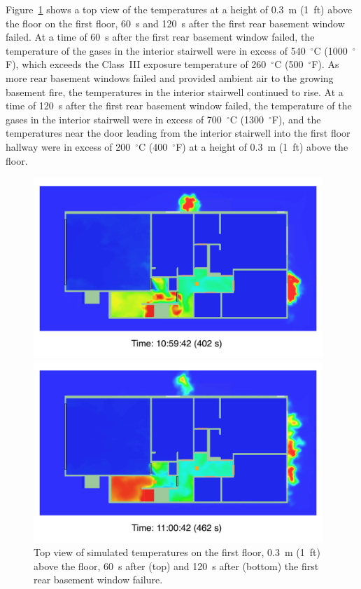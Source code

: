 \documentclass[12pt,oneside]{book}
\begin{document}
Figure~\ref{fig:smv_flow_path_top_2} shows a top view of the temperatures at a height of 0.3~m (1~ft) above the floor on the first floor, 60~s and 120~s after the first rear basement window failed. At a time of 60~s after the first rear basement window failed, the temperature of the gases in the interior stairwell were in excess of 540~$^{\circ}$C (1000~$^{\circ}$F), which exceeds the Class~III exposure temperature of 260~$^{\circ}$C (500~$^{\circ}$F). As more rear basement windows failed and provided ambient air to the growing basement fire, the temperatures in the interior stairwell continued to rise. At a time of 120~s after the first rear basement window failed, the temperature of the gases in the interior stairwell were in excess of 700~$^{\circ}$C (1300~$^{\circ}$F), and the temperatures near the door leading from the interior stairwell into the first floor hallway were in excess of 200~$^{\circ}$C (400~$^{\circ}$F) at a height of 0.3~m (1~ft) above the floor.


\clearpage


\begin{figure}[!ht]
\includegraphics[width=4.3in]{../Figures/SMV_Top_Temp_402_s}


\includegraphics[width=4.3in]{../Figures/SMV_Top_Temp_462_s}


\caption[Simulated temperatures on the first floor after basement window failure.]
{Top view of simulated temperatures on the first floor, 0.3~m (1~ft) above the floor, 60~s after (top) and 120~s after (bottom) the first rear basement window failure.}
\label{fig:smv_flow_path_top_2}
\end{figure}
\end{document}
